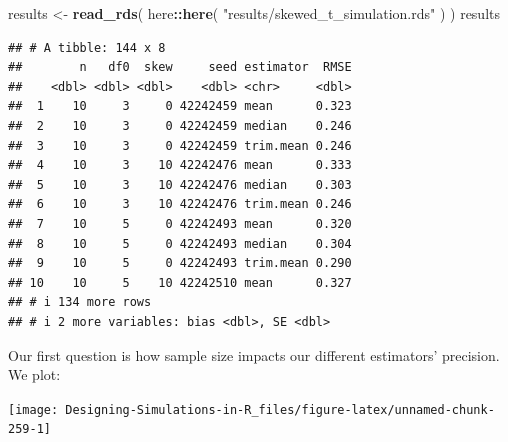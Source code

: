 \documentclass[
]{book}
\newenvironment{Shaded}{\begin{snugshade}}{\end{snugshade}}
\newcommand{\AttributeTok}[1]{\textcolor[rgb]{0.13,0.29,0.53}{#1}}
\newcommand{\FunctionTok}[1]{\textcolor[rgb]{0.13,0.29,0.53}{\textbf{#1}}}
\newcommand{\NormalTok}[1]{#1}
\newcommand{\OtherTok}[1]{\textcolor[rgb]{0.56,0.35,0.01}{#1}}
\newcommand{\SpecialCharTok}[1]{\textcolor[rgb]{0.81,0.36,0.00}{\textbf{#1}}}
\newcommand{\StringTok}[1]{\textcolor[rgb]{0.31,0.60,0.02}{#1}}
\begin{document}
\begin{Shaded}
\begin{Highlighting}[]
\NormalTok{results }\OtherTok{\textless{}{-}} \FunctionTok{read\_rds}\NormalTok{( here}\SpecialCharTok{::}\FunctionTok{here}\NormalTok{( }\StringTok{"results/skewed\_t\_simulation.rds"}\NormalTok{ ) )}
\NormalTok{results}
\end{Highlighting}
\end{Shaded}

\begin{verbatim}
## # A tibble: 144 x 8
##        n   df0  skew     seed estimator  RMSE
##    <dbl> <dbl> <dbl>    <dbl> <chr>     <dbl>
##  1    10     3     0 42242459 mean      0.323
##  2    10     3     0 42242459 median    0.246
##  3    10     3     0 42242459 trim.mean 0.246
##  4    10     3    10 42242476 mean      0.333
##  5    10     3    10 42242476 median    0.303
##  6    10     3    10 42242476 trim.mean 0.246
##  7    10     5     0 42242493 mean      0.320
##  8    10     5     0 42242493 median    0.304
##  9    10     5     0 42242493 trim.mean 0.290
## 10    10     5    10 42242510 mean      0.327
## # i 134 more rows
## # i 2 more variables: bias <dbl>, SE <dbl>
\end{verbatim}

Our first question is how sample size impacts our different estimators' precision.
We plot:

\begin{Shaded}
\end{Shaded}

\begin{center}\texttt{[image: Designing-Simulations-in-R\_files/figure-latex/unnamed-chunk-259-1]} \end{center}
\end{document}
